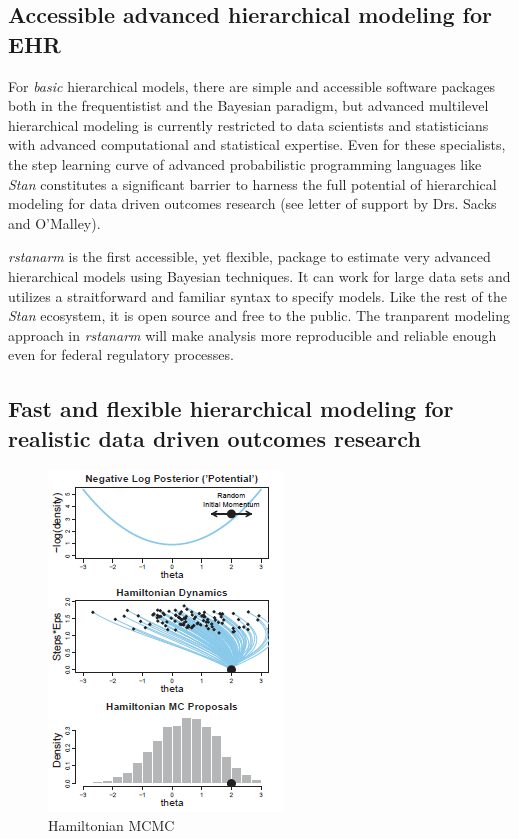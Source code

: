 \documentclass[11pt,notitlepage]{article}
\begin{document}
\subsection*{Accessible advanced hierarchical modeling for EHR}

For \textit{basic} hierarchical models, there are simple and accessible software 
packages both in the frequentistist and the Bayesian paradigm, but advanced multilevel 
hierarchical modeling is currently restricted to data scientists and statisticians 
with advanced computational and statistical expertise. Even for these specialists, 
the step learning curve of advanced probabilistic programming languages like 
\textit{Stan} constitutes a significant barrier to harness the full potential 
of hierarchical modeling for data driven outcomes research (see letter of support 
by Drs. Sacks and O'Malley).

\textit{rstanarm} is the first accessible, yet flexible, package to estimate
very advanced hierarchical models using Bayesian techniques. It can work for large data 
sets and utilizes a straitforward and familiar syntax to specify models. Like the 
rest of the \textit{Stan} ecosystem, it is open source and free to the public. 
The tranparent modeling approach in \textit{rstanarm} will make analysis more 
reproducible and reliable enough even for federal regulatory processes. 

\subsection*{Fast and flexible hierarchical modeling for realistic data driven outcomes research }

\begin{figure}
  \vspace{-15pt}
 \includegraphics[scale=0.85]{Figures/Hamiltonian.png}
  \vspace{-14pt}
  \caption{Hamiltonian MCMC}
    \label{fig:Hamiltonian}
 \vspace{-16 pt}
\end{figure}
\end{document}
